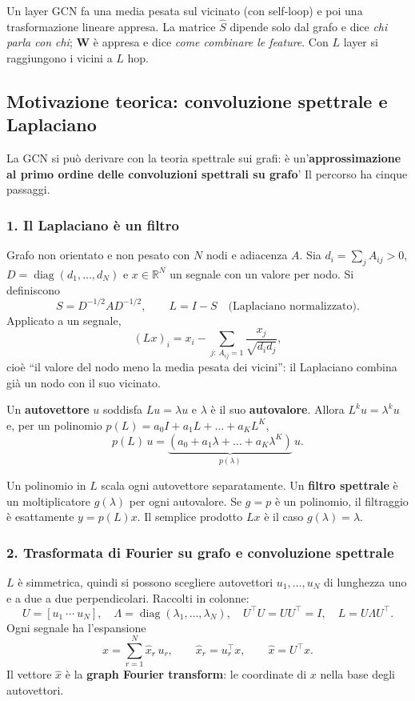 \documentclass[11pt,a4paper]{article}
\newcommand{\R}{\mathbb{R}}
\begin{document}
\begin{importante}
Un layer GCN fa una media pesata sul vicinato (con self-loop) e poi una
trasformazione lineare appresa. La matrice $\hat{S}$ dipende solo dal grafo e
dice \emph{chi parla con chi}; $\mathbf{W}$ è appresa e dice \emph{come combinare le
feature}. Con $L$ layer si raggiungono i vicini a $L$ hop.
\end{importante}
 
\subsection{Motivazione teorica: convoluzione spettrale e Laplaciano}
 
La GCN si può derivare con la teoria spettrale sui grafi: è un'\textbf{approssimazione
al primo ordine delle convoluzioni spettrali su grafo}'
Il percorso ha cinque passaggi.
 
\subsubsection{1. Il Laplaciano è un filtro}
Grafo non orientato e non pesato con $N$ nodi e adiacenza $A$. Sia
$d_i=\sum_jA_{ij}>0$, $D=\operatorname{diag}(d_1,\dots,d_N)$ e $x\in\R^N$ un
segnale con un valore per nodo. Si definiscono
\[
S=D^{-1/2}AD^{-1/2},\qquad L=I-S\quad\text{(Laplaciano normalizzato)}.
\]
Applicato a un segnale,
\[
(Lx)_i=x_i-\sum_{j:\,A_{ij}=1}\frac{x_j}{\sqrt{d_id_j}},
\]
cioè ``il valore del nodo meno la media pesata dei vicini'': il Laplaciano
combina già un nodo con il suo vicinato.
 
Un \textbf{autovettore} $u$ soddisfa $Lu=\lambda u$ e $\lambda$ è il suo
\textbf{autovalore}. Allora $L^ku=\lambda^ku$ e, per un polinomio
$p(L)=a_0I+a_1L+\dots+a_KL^K$,
\[
p(L)\,u=\underbrace{(a_0+a_1\lambda+\dots+a_K\lambda^K)}_{p(\lambda)}\,u .
\]
 
\begin{importante}
Un polinomio in $L$ scala ogni autovettore separatamente. Un \textbf{filtro
spettrale} è un moltiplicatore $g(\lambda)$ per ogni autovalore. Se $g=p$ è un
polinomio, il filtraggio è esattamente $y=p(L)x$. Il semplice prodotto $Lx$ è il
caso $g(\lambda)=\lambda$.
\end{importante}
 
\subsubsection{2. Trasformata di Fourier su grafo e convoluzione spettrale}
$L$ è simmetrica, quindi si possono scegliere autovettori $u_1,\dots,u_N$ di
lunghezza uno e a due a due perpendicolari. Raccolti in colonne:
\[
U=[u_1\ \cdots\ u_N],\quad \Lambda=\operatorname{diag}(\lambda_1,\dots,\lambda_N),\quad
U^\top U=UU^\top=I,\quad L=U\Lambda U^\top .
\]
Ogni segnale ha l'espansione
\[
x=\sum_{r=1}^{N}\hat x_r\,u_r,\qquad \hat x_r=u_r^\top x,\qquad \hat x=U^\top x .
\]
Il vettore $\hat x$ è la \textbf{graph Fourier transform}: le coordinate di $x$
nella base degli autovettori.
 
\end{document}
